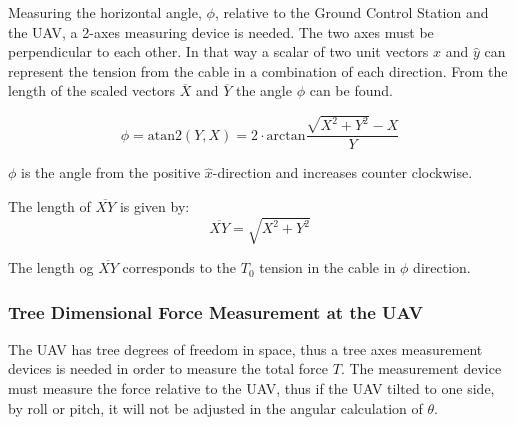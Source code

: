 \noindent
Measuring the horizontal angle, $\phi$, relative to the Ground Control Station and the UAV, a 2-axes measuring device is needed. The two axes must be perpendicular to each other. In that way a scalar of two unit vectors $\hat{x}$ and $\hat{y}$ can represent the tension from the cable in a combination of each direction. 
From the length of the scaled vectors $\overline{X}$ and $\overline{Y}$ the angle $\phi$ can be found.

\begin{equation}
\phi = \mathrm{atan2} (Y,  X) = 2 \cdot \mathrm{arctan} \frac{\sqrt{X^2+Y^2}-X}{Y}
\end{equation}

\noindent
$\phi$ is the angle from the positive $\hat{x}$-direction and increases counter clockwise. 

\noindent
The length of $\overline{XY}$ is given by:
\begin{equation}
\overline{XY} = \sqrt{X^2+Y^2}
\end{equation}

\noindent
The length og $\overline{XY}$ corresponds to the $T_0$ tension in the cable in $\phi$ direction. 

\subsubsection{Tree Dimensional Force Measurement at the UAV}
The UAV has tree degrees of freedom in space, thus a tree axes measurement devices is needed in order to measure the total force $T$.  The measurement device must measure the force relative to the UAV, thus if the UAV tilted to one side, by roll or pitch, it will not be adjusted in the angular calculation of $\theta$.  


